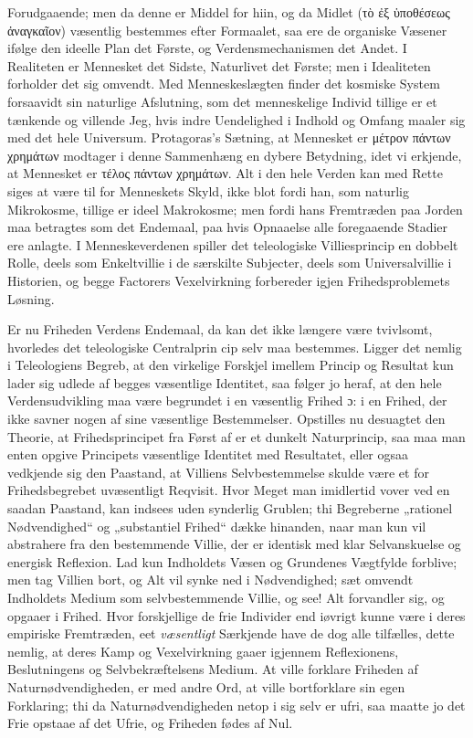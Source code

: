 \documentclass[12pt]{book}
\newcommand{\dsi}{\textup{ɔ:}}
\newcommand{\opage}[1]{\marginnote{\footnotesize\textit{[#1]}}}
\begin{document}
Forudgaaende; men da denne er Middel for hiin, og da Midlet (τὸ ἐξ
ὑποθέσεως ἀναγκαῖον) væsentlig bestemmes efter Formaalet, saa ere
de organiske Væsener ifølge den ideelle Plan det Første, og
Verdensmechanismen det Andet. I Realiteten er Mennesket det Sidste,
Naturlivet det Første; men i Idealiteten forholder det sig omvendt.
Med Menneskeslægten finder det kosmiske System forsaavidt sin
naturlige Afslutning, som det menneskelige Individ tillige er et
tænkende og villende Jeg, hvis indre Uendelighed i Indhold og
Omfang maaler sig med det hele Universum. Protagoras's Sætning, at
Mennesket er μέτρον πάντων χρημάτων modtager i denne Sammenhæng en
dybere Betydning, idet vi erkjende, at Mennesket er τέλος πάντων
χρημάτων. Alt i den hele Verden kan med Rette siges at være til for
Menneskets Skyld, ikke blot fordi han, som naturlig Mikrokosme,
tillige er ideel Makrokosme; men fordi hans Fremtræden paa Jorden
maa betragtes som det Endemaal, paa hvis Opnaaelse alle foregaaende
Stadier ere anlagte. I Menneskeverdenen spiller det teleologiske
Villiesprincip en dobbelt Rolle, deels som Enkeltvillie i de
særskilte Subjecter, deels som Universalvillie i Historien, og
begge Factorers Vexelvirkning forbereder igjen Frihedsproblemets
Løsning.

Er nu Friheden Verdens Endemaal, da kan det ikke længere være
tvivlsomt, hvorledes det teleologiske Centralprin%
\opage{232}cip selv maa bestemmes. Ligger det nemlig i Teleologiens Begreb, at
den virkelige Forskjel imellem Princip og Resultat kun lader sig
udlede af begges væsentlige Identitet, saa følger jo heraf, at den
hele Verdensudvikling maa være begrundet i en væsentlig Frihed \dsi{}
i en Frihed, der ikke savner nogen af sine væsentlige Bestemmelser.
Opstilles nu desuagtet den Theorie, at Frihedsprincipet fra Først
af er et dunkelt Naturprincip, saa maa man enten opgive Principets
væsentlige Identitet med Resultatet, eller ogsaa vedkjende sig den
Paastand, at Villiens Selvbestemmelse skulde være et for
Frihedsbegrebet uvæsentligt Reqvisit. Hvor Meget man imidlertid
vover ved en saadan Paastand, kan indsees uden synderlig Grublen;
thi Begreberne „rationel Nødvendighed“ og „substantiel Frihed“
dække hinanden, naar man kun vil abstrahere fra den bestemmende
Villie, der er identisk med klar Selvanskuelse og energisk
Reflexion. Lad kun Indholdets Væsen og Grundenes Vægtfylde
forblive; men tag Villien bort, og Alt vil synke ned i
Nødvendighed; sæt omvendt Indholdets Medium som selvbestemmende
Villie, og see! Alt forvandler sig, og opgaaer i Frihed. Hvor
forskjellige de frie Individer end iøvrigt kunne være i deres
empiriske Fremtræden, eet \emph{væsentligt} Særkjende have de dog
alle tilfælles, dette nemlig, at deres Kamp og Vexelvirkning gaaer
igjennem Reflexionens, Beslutningens og Selvbekræftelsens Medium.
At ville forklare Friheden af Naturnødvendigheden, er med andre
Ord, at ville bortforklare sin egen Forklaring; thi da
Naturnødvendigheden netop i sig selv er ufri, saa maatte jo det
Frie opstaae af det Ufrie, og Friheden fødes af Nul.
\end{document}
